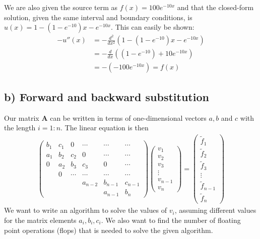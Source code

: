 \documentclass[12pt]{article}
\begin{document}
We are also given the source term as $f(x) = 100e^{-10x}$ and that the closed-form solution, given the same interval and boundary conditions, is $u(x) = 1 - \left(1-e^{-10} \right)x - e^{-10x}$. This can easily be shown:
\begin{align}
-u''(x) &= -\frac{d^2}{dx^2} \left( 1 - \left(1-e^{-10} \right) x - e^{-10x} \right) \nonumber \\
&= - \frac{d}{dx}\left((1-e^{-10}) + 10e^{-10x} \right) \nonumber\\
&= -\left(-100e^{-10x} \right) = f(x)
\end{align}
\subsection*{b) Forward and backward substitution}
Our matrix $\mathbf{A}$ can be written in terms of one-dimensional vectors $a,b$ and $c$ with the length $i=1:n$. The linear equation is then
\begin{align}
\begin{pmatrix}
b_1 & c_1 & 0 & \cdots & \cdots & \cdots \\
a_1 & b_2 & c_2 & 0 & \cdots & \cdots \\
0 & a_2 & b_3 & c_3 & 0 & \cdots \\
 & 0 & \cdots & \cdots & \cdots & \cdots \\
 & & & a_{n-2} & b_{n-1} & c_{n-1} \\
 & & & & a_{n-1} & b_n
\end{pmatrix}
\begin{pmatrix}
v_1 \\
v_2 \\
v_3 \\
\vdots \\
v_{n-1} \\
v_n
\end{pmatrix}
=
\begin{pmatrix}
\tilde{f}_1 \\
\tilde{f}_2 \\
\tilde{f}_3 \\
\vdots \\
\tilde{f}_{n-1} \\
\tilde{f}_n
\end{pmatrix}
\end{align}
We want to write an algorithm to solve the values of $v_i$, assuming different values for the matrix elements $a_i, b_i, c_i$. We also want to find the number of floating point operations (flops) that is needed to solve the given algorithm.
\end{document}

